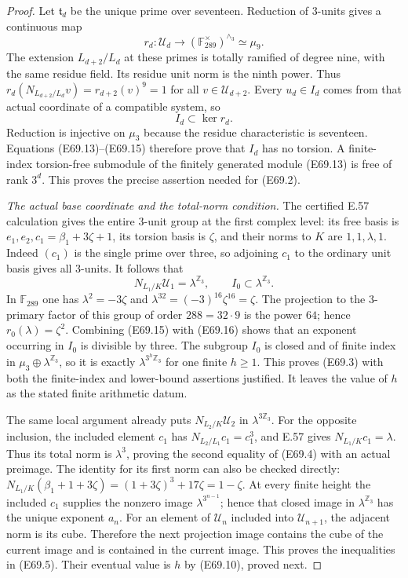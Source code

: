 \begin{proof}
Let $\mathfrak t_d$ be the unique prime over seventeen.
Reduction of $3$-units gives a continuous map
\[
 r_d:\mathcal U_d\longrightarrow
      (\mathbb F_{289}^{\times})^{\wedge_3}\simeq\mu_9.
 \tag{E69.14}
\]
The extension $L_{d+2}/L_d$ at these primes is totally ramified of
degree nine, with the same residue field. Its residue unit norm is
the ninth power. Thus
$r_d(N_{L_{d+2}/L_d}v)=r_{d+2}(v)^9=1$ for all
$v\in\mathcal U_{d+2}$.
Every $u_d\in I_d$ comes from that actual coordinate of a compatible
system, so
\[
                         I_d\subset\ker r_d.
 \tag{E69.15}
\]
Reduction is injective on $\mu_3$ because the residue characteristic
is seventeen. Equations (E69.13)--(E69.15) therefore prove that
$I_d$ has no torsion. A finite-index torsion-free submodule of the
finitely generated module (E69.13) is free of rank $3^d$.
This proves the precise assertion needed for (E69.2).

\emph{The actual base coordinate and the total-norm condition.}
The certified E.57 calculation gives the entire $3$-unit group at
the first complex level: its free basis is
$e_1,e_2,c_1=\beta_1+3\zeta+1$, its torsion basis is $\zeta$, and
their norms to $K$ are $1,1,\lambda,1$.
Indeed $(c_1)$ is the single prime over three, so adjoining $c_1$
to the ordinary unit basis gives all $3$-units.
It follows that
\[
       N_{L_1/K}\mathcal U_1=\lambda^{\mathbb Z_3},
       \qquad I_0\subset\lambda^{\mathbb Z_3}.
 \tag{E69.16}
\]
In $\mathbb F_{289}$ one has
$\lambda^2=-3\zeta$ and
$\lambda^{32}=(-3)^{16}\zeta^{16}=\zeta$.
The projection to the $3$-primary factor of this group of order
$288=32\cdot9$ is the power $64$; hence
$r_0(\lambda)=\zeta^2$.
Combining (E69.15) with (E69.16) shows that an exponent occurring
in $I_0$ is divisible by three.
The subgroup $I_0$ is closed and of finite index in
$\mu_3\oplus\lambda^{\mathbb Z_3}$, so it is exactly
$\lambda^{3^h\mathbb Z_3}$ for one finite $h\ge1$.
This proves (E69.3) with both the finite-index and lower-bound
assertions justified. It leaves the value of $h$ as the stated
finite arithmetic datum.

The same local argument already puts
$N_{L_2/K}\mathcal U_2$ in $\lambda^{3\mathbb Z_3}$.
For the opposite inclusion, the included element $c_1$ has
$N_{L_2/L_1}c_1=c_1^3$, and E.57 gives
$N_{L_1/K}c_1=\lambda$. Thus its total norm is $\lambda^3$,
proving the second equality of (E69.4) with an actual preimage.
The identity for its first norm can also be checked directly:
$N_{L_1/K}(\beta_1+1+3\zeta)
=(1+3\zeta)^3+17\zeta=1-\zeta$.
At every finite height the included $c_1$ supplies the nonzero
image $\lambda^{3^{n-1}}$; hence that closed image in
$\lambda^{\mathbb Z_3}$ has the unique exponent $a_n$.
For an element of $\mathcal U_n$ included into $\mathcal U_{n+1}$,
the adjacent norm is its cube. Therefore the next projection image
contains the cube of the current image and is contained in the
current image. This proves the inequalities in (E69.5).
Their eventual value is $h$ by (E69.10), proved next.


\end{proof}
